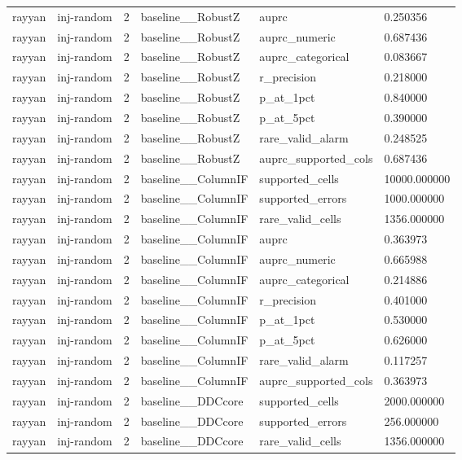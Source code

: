 \begin{tabular}{llllll}
rayyan & inj-random & 2 & baseline\_\_RobustZ & auprc & 0.250356 \\
rayyan & inj-random & 2 & baseline\_\_RobustZ & auprc\_numeric & 0.687436 \\
rayyan & inj-random & 2 & baseline\_\_RobustZ & auprc\_categorical & 0.083667 \\
rayyan & inj-random & 2 & baseline\_\_RobustZ & r\_precision & 0.218000 \\
rayyan & inj-random & 2 & baseline\_\_RobustZ & p\_at\_1pct & 0.840000 \\
rayyan & inj-random & 2 & baseline\_\_RobustZ & p\_at\_5pct & 0.390000 \\
rayyan & inj-random & 2 & baseline\_\_RobustZ & rare\_valid\_alarm & 0.248525 \\
rayyan & inj-random & 2 & baseline\_\_RobustZ & auprc\_supported\_cols & 0.687436 \\
rayyan & inj-random & 2 & baseline\_\_ColumnIF & supported\_cells & 10000.000000 \\
rayyan & inj-random & 2 & baseline\_\_ColumnIF & supported\_errors & 1000.000000 \\
rayyan & inj-random & 2 & baseline\_\_ColumnIF & rare\_valid\_cells & 1356.000000 \\
rayyan & inj-random & 2 & baseline\_\_ColumnIF & auprc & 0.363973 \\
rayyan & inj-random & 2 & baseline\_\_ColumnIF & auprc\_numeric & 0.665988 \\
rayyan & inj-random & 2 & baseline\_\_ColumnIF & auprc\_categorical & 0.214886 \\
rayyan & inj-random & 2 & baseline\_\_ColumnIF & r\_precision & 0.401000 \\
rayyan & inj-random & 2 & baseline\_\_ColumnIF & p\_at\_1pct & 0.530000 \\
rayyan & inj-random & 2 & baseline\_\_ColumnIF & p\_at\_5pct & 0.626000 \\
rayyan & inj-random & 2 & baseline\_\_ColumnIF & rare\_valid\_alarm & 0.117257 \\
rayyan & inj-random & 2 & baseline\_\_ColumnIF & auprc\_supported\_cols & 0.363973 \\
rayyan & inj-random & 2 & baseline\_\_DDCcore & supported\_cells & 2000.000000 \\
rayyan & inj-random & 2 & baseline\_\_DDCcore & supported\_errors & 256.000000 \\
rayyan & inj-random & 2 & baseline\_\_DDCcore & rare\_valid\_cells & 1356.000000 \\

\end{tabular}

